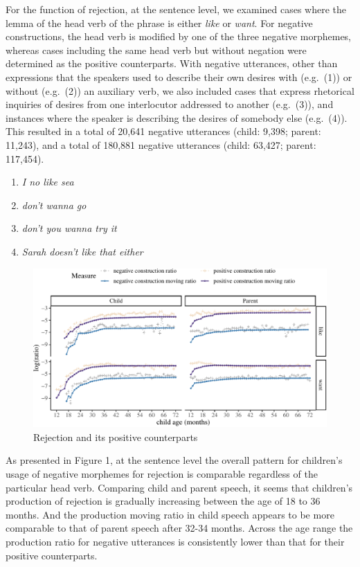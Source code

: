 \documentclass[
  english,
  man,floatsintext]{apa6}
\providecommand{\tightlist}{%
  \setlength{\itemsep}{0pt}\setlength{\parskip}{0pt}}
\begin{document}
For the function of rejection, at the sentence level, we examined cases where the lemma of the head verb of the phrase is either \emph{like} or \emph{want}. For negative constructions, the head verb is modified by one of the three negative morphemes, whereas cases including the same head verb but without negation were determined as the positive counterparts. With negative utterances, other than expressions that the speakers used to describe their own desires with (e.g.~(1)) or without (e.g.~(2)) an auxiliary verb, we also included cases that express rhetorical inquiries of desires from one interlocutor addressed to another (e.g.~(3)), and instances where the speaker is describing the desires of somebody else (e.g.~(4)). This resulted in a total of 20,641 negative utterances (child: 9,398; parent: 11,243), and a total of 180,881 negative utterances (child: 63,427; parent: 117,454).

\begin{enumerate}
\def\labelenumi{(\arabic{enumi})}
\tightlist
\item
  \emph{I no like sea}
\item
  \emph{don't wanna go}
\item
  \emph{don't you wanna try it}
\item
  \emph{Sarah doesn't like that either}
\end{enumerate}

\begin{figure}[H]

{\centering \includegraphics{neg_construction_article_files/figure-latex/emotion-1} 

}

\caption{Rejection and its positive counterparts}\label{fig:emotion}
\end{figure}

As presented in Figure 1, at the sentence level the overall pattern for children's usage of negative morphemes for rejection is comparable regardless of the particular head verb. Comparing child and parent speech, it seems that children's production of rejection is gradually increasing between the age of 18 to 36 months. And the production moving ratio in child speech appears to be more comparable to that of parent speech after 32-34 months. Across the age range the production ratio for negative utterances is consistently lower than that for their positive counterparts.
\end{document}
